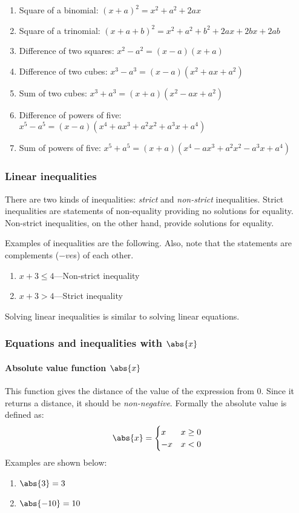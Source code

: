 \begin{enumerate}
    \item Square of a binomial: $(x+a)^2 = x^2+a^2+2ax$
    \item Square of a trinomial: $(x+a+b)^2 = x^2+a^2+b^2+2ax+2bx+2ab$
    \item Difference of two squares: $x^2 - a^2 = (x-a)(x+a)$
    \item Difference of two cubes: $x^3 - a^3 = (x-a)(x^2+ax+a^2)$
    \item Sum of two cubes: $x^3+a^3 = (x+a)(x^2-ax+a^2)$
    \item Difference of powers of five: $x^5-a^5 = (x-a)(x^4+ax^3+a^2x^2+a^3x+a^4)$
    \item Sum of powers of five: $x^5+a^5 = (x+a)(x^4-ax^3+a^2x^2-a^3x+a^4)$
\end{enumerate}

\subsubsection{Linear inequalities}
There are two kinds of inequalities: \emph{strict} and \emph{non-strict} inequalities.
Strict inequalities are statements of non-equality providing no solutions for equality.
Non-strict inequalities, on the other hand, provide solutions for equality.

Examples of inequalities are the following.
Also, note that the statements are complements ($-ve$s) of each other.

\begin{enumerate}
    \item $x+3 \leq 4$---Non-strict inequality
    \item $x+3 > 4$---Strict inequality
\end{enumerate}

Solving linear inequalities is similar to solving linear equations.

\subsubsection{Equations and inequalities with $\abs{x}$}
\paragraph{Absolute value function $\abs{x}$}
This function gives the distance of the value of the expression from $0$.
Since it returns a distance, it should be \emph{non-negative}.
Formally the absolute value is defined as:
\[
\abs{x} = 
\begin{cases}
x & x \geq 0 \\
-x & x < 0
\end{cases}
\]
Examples are shown below:
\begin{enumerate}
    \item $\abs{3} = 3$
    \item $\abs{-10} = 10$
\end{enumerate}

